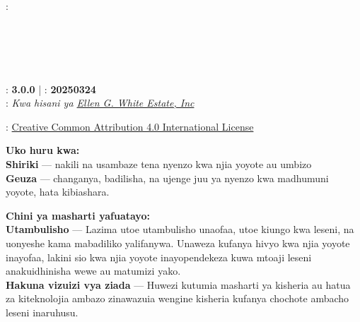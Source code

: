 \clearpage %

{\small
\setlength{\parindent}{0em}\setlength{\parskip}{1em}

{\large \emcap{\booktitle}}

: \textbf{\authorname} \\
\ifx\editor\undefined\else\if\relax\detokenize\expandafter{\editor}\relax{} \\ \fi\fi
\ifx\translatedby\undefined\else\if\relax\detokenize\expandafter{\translatedby}\relax{} \\ \fi\fi
\ifx\publisher\undefined\else\if\relax\detokenize\expandafter{\publisher}\relax{} \\ \fi\fi
\ifx\publishingplace\undefined\else\if\relax\detokenize\expandafter{\publishingplace}\relax{} \\ \fi\fi
\ifx\isbn\undefined\else\if\relax\detokenize\expandafter{\isbn}\relax{} \\ \fi\fi
{}: \textbf{3.0.0} | : \textbf{20250324} \\
: \textit{Kwa hisani ya \href{https://ellenwhite.org/}{Ellen G. White Estate, Inc}}

\vfill

: \ifepub\else\ccby{}\fi \href{https://creativecommons.org/licenses/by/4.0/}{Creative Common Attribution 4.0 International License}

\textbf{Uko huru kwa:} \\
\textbf{Shiriki} — nakili na usambaze tena nyenzo kwa njia yoyote au
umbizo \\
\textbf{Geuza} — changanya, badilisha, na ujenge juu ya nyenzo kwa madhumuni yoyote, hata kibiashara.

\textbf{Chini ya masharti yafuatayo:} \\
\textbf{Utambulisho} — Lazima utoe utambulisho unaofaa, utoe kiungo kwa leseni, na uonyeshe kama mabadiliko yalifanywa. Unaweza kufanya hivyo kwa njia yoyote inayofaa, lakini sio kwa njia yoyote inayopendekeza kuwa mtoaji leseni anakuidhinisha wewe au matumizi yako. \\
\textbf{Hakuna vizuizi vya ziada} — Huwezi kutumia masharti ya kisheria au hatua za kiteknolojia ambazo zinawazuia wengine kisheria kufanya chochote ambacho leseni inaruhusu.

}
